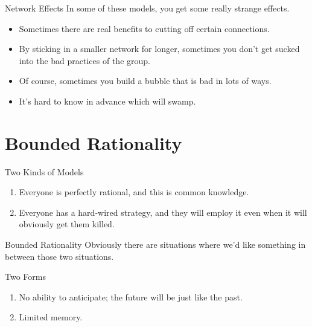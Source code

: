 \documentclass[
  ignorenonframetext,
]{beamer}
\providecommand{\tightlist}{%
  \setlength{\itemsep}{0pt}\setlength{\parskip}{0pt}}
\begin{document}
\begin{frame}{Network Effects}
\protect\hypertarget{network-effects}{}
In some of these models, you get some really strange effects.

\begin{itemize}
\tightlist
\item
  Sometimes there are real benefits to cutting off certain connections.
\item
  By sticking in a smaller network for longer, sometimes you don't get
  sucked into the bad practices of the group.
\item
  Of course, sometimes you build a bubble that is bad in lots of ways.
\item
  It's hard to know in advance which will swamp.
\end{itemize}
\end{frame}

\hypertarget{bounded-rationality}{%
\section{Bounded Rationality}\label{bounded-rationality}}

\begin{frame}{Two Kinds of Models}
\protect\hypertarget{two-kinds-of-models}{}
\begin{enumerate}
\tightlist
\item
  Everyone is perfectly rational, and this is common knowledge.
\item
  Everyone has a hard-wired strategy, and they will employ it even when
  it will obviously get them killed.
\end{enumerate}
\end{frame}

\begin{frame}{Bounded Rationality}
\protect\hypertarget{bounded-rationality-1}{}
Obviously there are situations where we'd like something in between
those two situations.
\end{frame}

\begin{frame}{Two Forms}
\protect\hypertarget{two-forms}{}
\begin{enumerate}[<+->]
\tightlist
\item
  No ability to anticipate; the future will be just like the past.
\item
  Limited memory.
\end{enumerate}
\end{frame}
\end{document}
